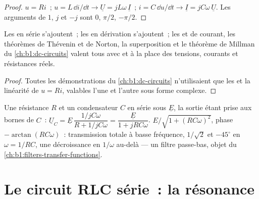 \begin{proof}
$u = Ri$~; $u = L\,\dd i/\dd t \to \underline U = jL\omega\,\underline I$~;
$i = C\,\dd u/\dd t \to \underline I = jC\omega\,\underline U$. Les
arguments de $1$, $j$ et $-j$ sont $0$, $\pi/2$, $-\pi/2$.
\end{proof}

\begin{proposition}\label{prop:b1:sinusoidal-impedance:assoc}
Les  en série s'ajoutent~; les  en dérivation
s'ajoutent~; les  et de courant, les théorèmes de
Thévenin et de Norton, la superposition et le théorème de Millman du
\cref{ch:b1:dc-circuits} valent tous avec  et
 à la place des tensions, courants et résistances réels.
\end{proposition}

\begin{proof}
Toutes les démonstrations du \cref{ch:b1:dc-circuits} n'utilisaient que
les  et la linéarité de $u = Ri$, valables l'une et
l'autre sous forme complexe.
\end{proof}

\begin{example}[Le diviseur RC]\label{ex:b1:sinusoidal-impedance:rcdivider}
Une résistance $R$ et un condensateur $C$ en série sous $\underline E$,
la sortie étant prise aux bornes de $C$~: $\underline U_C = \underline E\,\dfrac{1/jC\omega}
{R + 1/jC\omega} = \dfrac{\underline E}{1 + jRC\omega}$. 
$E/\sqrt{1 + (RC\omega)^2}$, phase $-\arctan(RC\omega)$~: transmission
totale à basse fréquence, $1/\sqrt2$ et $-45^\circ$ en
$\omega = 1/RC$, une décroissance en $1/\omega$ au-delà --- un filtre
passe-bas, objet du \cref{ch:b1:filters-transfer-functions}.
\end{example}

\section{Le circuit RLC série~: la résonance}

